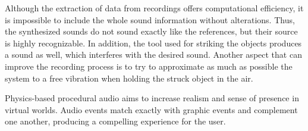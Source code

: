 Although the extraction of data from recordings offers computational efficiency, it is impossible to include the whole sound information without alterations. Thus, the synthesized sounds do not sound exactly like the references, but their source is highly recognizable. In addition, the tool used for striking the objects produces a sound as well, which interferes with the desired sound. Another aspect that can improve the recording process is to try to approximate as much as possible the system to a free vibration when holding the struck object in the air.

Physics-based procedural audio aims to increase realism and sense of presence in virtual worlds. Audio events match exactly with graphic events and complement one another, producing a compelling experience for the user.
